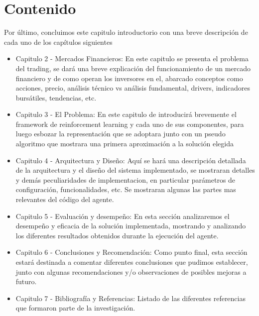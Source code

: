 \section{Contenido}
Por último, concluimos este capitulo introductorio con una breve descripción de cada uno de los capítulos siguientes

\begin{itemize} %
	\item Capitulo 2 - Mercados Financieros: En este capitulo se presenta el problema del trading, se dará una breve explicación del funcionamiento de un mercado financiero y de como operan los inversores en el, abarcado conceptos como acciones, precio, análisis técnico vs análisis fundamental, drivers, indicadores bursátiles, tendencias, etc.
	\item Capitulo 3 - El Problema: En este capitulo de introducirá brevemente el framework de reinforcement learning y cada uno de sus componentes, para luego esbozar la representación que se adoptara junto con un pseudo algoritmo que mostrara una primera aproximación a la solución elegida
	\item Capitulo 4 - Arquitectura y Diseño: Aquí se hará una descripción detallada de la arquitectura y el diseño del sistema implementado, se mostraran detalles y demás peculiaridades de implementacion, en particular parámetros de configuración, funcionalidades, etc. Se mostraran algunas las partes mas relevantes del código del agente.
	\item Capitulo 5 - Evaluación y desempeño: En esta sección analizaremos el desempeño y eficacia de la solución implementada, mostrando y analizando los diferentes resultados obtenidos durante la ejecución del agente.
	\item Capitulo 6 - Conclusiones y Recomendación: Como punto final, esta sección estará destinada a comentar diferentes conclusiones que pudimos establecer, junto con algunas recomendaciones y/o observaciones de posibles mejoras a futuro.
	\item Capitulo 7 - Bibliografía y Referencias: Listado de las diferentes referencias que formaron parte de la investigación.
\end{itemize}